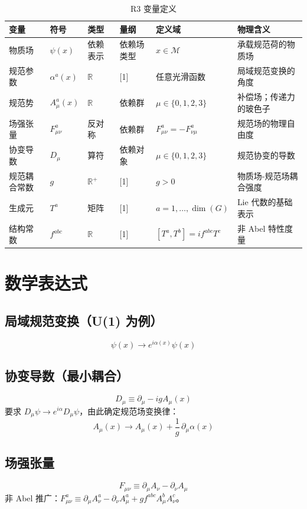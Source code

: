 \begin{table}[h]
\centering
\small
\begin{tabular}{p{2.2cm}p{1.8cm}p{1.8cm}p{1.5cm}p{3cm}p{4cm}}
\toprule
\textbf{变量} & \textbf{符号} & \textbf{类型} & \textbf{量纲} & \textbf{定义域} & \textbf{物理含义} \\
\midrule
物质场 & $\psi(x)$ & 依赖表示 & 依赖场类型 & $x \in \mathcal{M}$ & 承载规范荷的物质场 \\
规范参数 & $\alpha^a(x)$ & $\mathbb{R}$ & [1] & 任意光滑函数 & 局域规范变换的角度 \\
规范势 & $A_\mu^a(x)$ & $\mathbb{R}$ & 依赖群 & $\mu \in \{0,1,2,3\}$ & 补偿场；传递力的玻色子 \\
场强张量 & $F_{\mu\nu}^a$ & 反对称 & 依赖群 & $F_{\mu\nu}^a = -F_{\nu\mu}^a$ & 规范场的物理自由度 \\
协变导数 & $D_\mu$ & 算符 & 依赖对象 & $\mu \in \{0,1,2,3\}$ & 规范协变的导数 \\
规范耦合常数 & $g$ & $\mathbb{R}^+$ & [1] & $g > 0$ & 物质场-规范场耦合强度 \\
生成元 & $T^a$ & 矩阵 & [1] & $a = 1,\dots,\dim(G)$ & Lie 代数的基础表示 \\
结构常数 & $f^{abc}$ & $\mathbb{R}$ & [1] & $[T^a,T^b] = if^{abc}T^c$ & 非 Abel 特性度量 \\
\bottomrule
\end{tabular}
\caption{R3 变量定义}
\end{table}

\section{数学表达式}

\subsection{局域规范变换（U(1) 为例）}
\[
\psi(x) \to e^{i\alpha(x)}\psi(x)
\]

\subsection{协变导数（最小耦合）}
\[
D_\mu \equiv \partial_\mu - i g A_\mu(x)
\]
要求 $D_\mu\psi \to e^{i\alpha} D_\mu\psi$，由此确定规范场变换律：
\[
A_\mu(x) \to A_\mu(x) + \frac{1}{g}\,\partial_\mu\alpha(x)
\]

\subsection{场强张量}
\[
F_{\mu\nu} \equiv \partial_\mu A_\nu - \partial_\nu A_\mu
\]
非 Abel 推广：$F_{\mu\nu}^a \equiv \partial_\mu A_\nu^a - \partial_\nu A_\mu^a + g f^{abc} A_\mu^b A_\nu^c$。

